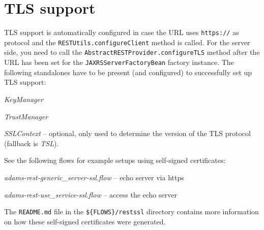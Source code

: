 \documentclass[a4paper]{book}
\begin{document}
\section{TLS support}
\label{tls_support}
TLS support is automatically configured in case the URL uses \verb|https://| as
protocol and the \verb|RESTUtils.configureClient| method is called. For the
server side, you need to call the \verb|AbstractRESTProvider.configureTLS| method
after the URL has been set for the \verb|JAXRSServerFactoryBean| factory instance.
The following standalones have to be present (and configured) to successfully
set up TLS support:
\begin{tight_itemize}
  \item \textit{KeyManager}
  \item \textit{TrustManager}
  \item \textit{SSLContext} -- optional, only used to determine the version of the
  TLS protocol (fallback is \textit{TSL}).
\end{tight_itemize}
See the following flows for example setups using self-signed certificates:
\begin{tight_itemize}
  \item \textit{adams-rest-generic\_server-ssl.flow} -- echo server via https
  \item \textit{adams-rest-use\_service-ssl.flow} -- access the echo server
\end{tight_itemize}
The \verb|README.md| file in the \verb|${FLOWS}/restssl| directory contains
more information on how these self-signed certificates were generated.



\end{document}
